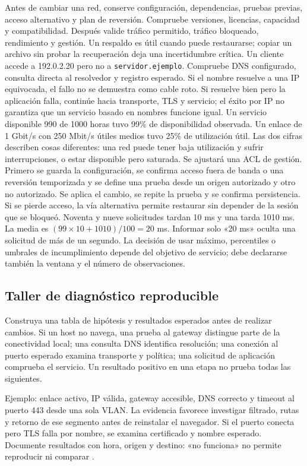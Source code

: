 Antes de cambiar una red, conserve configuración, dependencias, pruebas previas, acceso alternativo y plan de reversión. Compruebe versiones, licencias, capacidad y compatibilidad. Después valide tráfico permitido, tráfico bloqueado, rendimiento y gestión. Un respaldo es útil cuando puede restaurarse; copiar un archivo sin probar la recuperación deja una incertidumbre crítica.
Un cliente accede a 192.0.2.20 pero no a \texttt{servidor.ejemplo}. Compruebe DNS configurado, consulta directa al resolvedor y registro esperado. Si el nombre resuelve a una IP equivocada, el fallo no se demuestra como cable roto. Si resuelve bien pero la aplicación falla, continúe hacia transporte, TLS y servicio; el éxito por IP no garantiza que un servicio basado en nombres funcione igual.
Un servicio disponible 990 de 1000 horas tuvo 99\% de disponibilidad observada. Un enlace de 1 Gbit/s con 250 Mbit/s útiles medios tuvo 25\% de utilización útil. Las dos cifras describen cosas diferentes: una red puede tener baja utilización y sufrir interrupciones, o estar disponible pero saturada.
Se ajustará una ACL de gestión. Primero se guarda la configuración, se confirma acceso fuera de banda o una reversión temporizada y se define una prueba desde un origen autorizado y otro no autorizado. Se aplica el cambio, se repite la prueba y se confirma persistencia. Si se pierde acceso, la vía alternativa permite restaurar sin depender de la sesión que se bloqueó.
Noventa y nueve solicitudes tardan 10 ms y una tarda 1010 ms. La media es $(99\times10+1010)/100=20$ ms. Informar solo «20 ms» oculta una solicitud de más de un segundo. La decisión de usar máximo, percentiles o umbrales de incumplimiento depende del objetivo de servicio; debe declararse también la ventana y el número de observaciones.

\subsection{Taller de diagnóstico reproducible}
Construya una tabla de hipótesis y resultados esperados antes de realizar cambios. Si un host no navega, una prueba al gateway distingue parte de la conectividad local; una consulta DNS identifica resolución; una conexión al puerto esperado examina transporte y política; una solicitud de aplicación comprueba el servicio. Un resultado positivo en una etapa no prueba todas las siguientes.

Ejemplo: enlace activo, IP válida, gateway accesible, DNS correcto y timeout al puerto 443 desde una sola VLAN. La evidencia favorece investigar filtrado, rutas y retorno de ese segmento antes de reinstalar el navegador. Si el puerto conecta pero TLS falla por nombre, se examina certificado y nombre esperado. Documente resultados con hora, origen y destino: «no funciona» no permite reproducir ni comparar \cite{networks,rfc1034,rfc9293,tls}.

